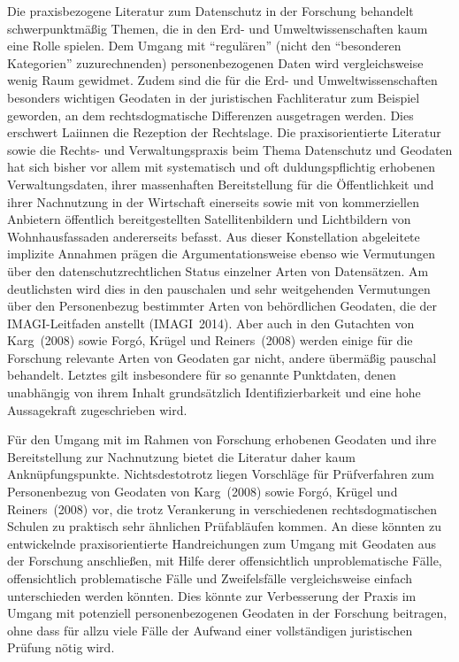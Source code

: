 \documentclass[a4paper,
fontsize=11pt,
oneside,
numbers=noperiodatend,
parskip=half-,
bibliography=totoc,
final
]{scrartcl}
\begin{document}
Die praxisbezogene Literatur zum Datenschutz in der Forschung behandelt
schwerpunktmäßig Themen, die in den Erd- und Umweltwissenschaften kaum
eine Rolle spielen. Dem Umgang mit \enquote{regulären} (nicht den
\enquote{besonderen Kategorien} zuzurechnenden) personenbezogenen Daten
wird vergleichsweise wenig Raum gewidmet. Zudem sind die für die Erd-
und Umweltwissenschaften besonders wichtigen Geodaten in der
juristischen Fachliteratur zum Beispiel geworden, an dem
rechtsdogmatische Differenzen ausgetragen werden. Dies erschwert
Laiinnen die Rezeption der Rechtslage. Die praxisorientierte Literatur
sowie die Rechts- und Verwaltungspraxis beim Thema Datenschutz und
Geodaten hat sich bisher vor allem mit systematisch und oft
duldungspflichtig erhobenen Verwaltungsdaten, ihrer massenhaften
Bereitstellung für die Öffentlichkeit und ihrer Nachnutzung in der
Wirtschaft einerseits sowie mit von kommerziellen Anbietern öffentlich
bereitgestellten Satellitenbildern und Lichtbildern von Wohnhausfassaden
andererseits befasst. Aus dieser Konstellation abgeleitete implizite
Annahmen prägen die Argumentationsweise ebenso wie Vermutungen über den
datenschutzrechtlichen Status einzelner Arten von Datensätzen. Am
deutlichsten wird dies in den pauschalen und sehr weitgehenden
Vermutungen über den Personenbezug bestimmter Arten von behördlichen
Geodaten, die der IMAGI-Leitfaden anstellt (IMAGI~2014). Aber auch in
den Gutachten von Karg~(2008) sowie Forgó, Krügel und Reiners~(2008)
werden einige für die Forschung relevante Arten von Geodaten gar nicht,
andere übermäßig pauschal behandelt. Letztes gilt insbesondere für so
genannte Punktdaten, denen unabhängig von ihrem Inhalt grundsätzlich
Identifizierbarkeit und eine hohe Aussagekraft zugeschrieben wird.

Für den Umgang mit im Rahmen von Forschung erhobenen Geodaten und ihre
Bereitstellung zur Nachnutzung bietet die Literatur daher kaum
Anknüpfungspunkte. Nichtsdestotrotz liegen Vorschläge für Prüfverfahren
zum Personenbezug von Geodaten von Karg~(2008) sowie Forgó, Krügel und
Reiners~(2008) vor, die trotz Verankerung in verschiedenen
rechtsdogmatischen Schulen zu praktisch sehr ähnlichen Prüfabläufen
kommen. An diese könnten zu entwickelnde praxisorientierte
Handreichungen zum Umgang mit Geodaten aus der Forschung anschließen,
mit Hilfe derer offensichtlich unproblematische Fälle, offensichtlich
problematische Fälle und Zweifelsfälle vergleichsweise einfach
unterschieden werden könnten. Dies könnte zur Verbesserung der Praxis im
Umgang mit potenziell personenbezogenen Geodaten in der Forschung
beitragen, ohne dass für allzu viele Fälle der Aufwand einer
vollständigen juristischen Prüfung nötig wird.
\end{document}
